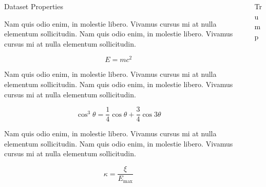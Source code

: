 \documentclass[final]{beamer}
\newlength{\sepwid}
\newlength{\onecolwid}
\newlength{\twocolwid}
\begin{document}
\begin{frame}[t]
\begin{columns}[t]
\begin{column}{\onecolwid}

\begin{block}{Dataset Properties}

Nam quis odio enim, in molestie libero. Vivamus cursus mi at nulla elementum sollicitudin. Nam quis odio enim, in molestie libero. Vivamus cursus mi at nulla elementum sollicitudin.
  
\begin{equation}
E = mc^{2}
\label{eqn:Einstein}
\end{equation}

Nam quis odio enim, in molestie libero. Vivamus cursus mi at nulla elementum sollicitudin. Nam quis odio enim, in molestie libero. Vivamus cursus mi at nulla elementum sollicitudin.

\begin{equation}
\cos^3 \theta =\frac{1}{4}\cos\theta+\frac{3}{4}\cos 3\theta
\label{eq:refname}
\end{equation}

Nam quis odio enim, in molestie libero. Vivamus cursus mi at nulla elementum sollicitudin. Nam quis odio enim, in molestie libero. Vivamus cursus mi at nulla elementum sollicitudin.

\begin{equation}
\kappa =\frac{\xi}{E_{\mathrm{max}}} %
\end{equation}

\end{block}


\end{column} %



\begin{column}{\sepwid}\end{column} %

\begin{column}{\twocolwid} %


\begin{block}{Trump}


\end{block}
\end{column}
\end{columns}
\end{frame}
\end{document}
